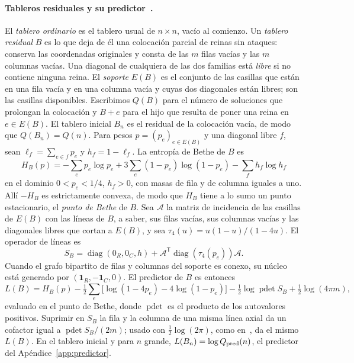 \paragraph{Tableros residuales y su predictor~\cite[\S2 y \S6.1]{tc}.} El \emph{tablero ordinario} es el
tablero usual de \(n\times n\), vacío al comienzo. Un \emph{tablero residual} \(B\) es lo que deja de él
una colocación parcial de reinas sin ataques: conserva las coordenadas originales y consta de las \(m\)
filas vacías y las \(m\) columnas vacías. Una diagonal de cualquiera de las dos familias está
\emph{libre} si no contiene ninguna reina. El \emph{soporte} \(E(B)\) es el conjunto de las casillas que
están en una fila vacía y en una columna vacía y cuyas dos diagonales están libres; son las casillas
disponibles. Escribimos \(Q(B)\) para el número de soluciones que prolongan la colocación y \(B+e\) para
el hijo que resulta de poner una reina en \(e\in E(B)\). El tablero inicial \(B_n\) es el residual de la
colocación vacía, de modo que \(Q(B_n)=Q(n)\). Para pesos \(p=(p_e)_{e\in E(B)}\) y una diagonal libre
\(f\), sean \(\ell_f=\sum_{e\in f}p_e\) y \(h_f=1-\ell_f\). La entropía de Bethe de \(B\) es
\begin{equation}\label{eq:bethe-residual}
 H_B(p)=-\sum_e p_e\log p_e+3\sum_e(1-p_e)\log(1-p_e)-\sum_f h_f\log h_f
\end{equation}
en el dominio \(0<p_e<1/4\), \(h_f>0\), con masas de fila y de columna iguales a uno. Allí \(-H_B\) es
estrictamente convexa, de modo que \(H_B\) tiene a lo sumo un punto estacionario, el \emph{punto de
Bethe} de \(B\). Sea \(\mathcal A\) la matriz de incidencia de las casillas de \(E(B)\) con las líneas
de \(B\), a saber, sus filas vacías, sus columnas vacías y las diagonales libres que cortan a \(E(B)\),
y sea \(\tau_4(u)=u(1-u)/(1-4u)\). El operador de líneas es
\[
 S_B=\operatorname{diag}(0_R,0_C,h)+\mathcal A^{\mathsf T}\operatorname{diag}(\tau_4(p_e))\mathcal A .
\]
Cuando el grafo bipartito de filas y columnas del soporte es conexo, su núcleo está generado por
\((\mathbf1_R,-\mathbf1_C,0)\). El predictor de \(B\) es entonces
\begin{equation}\label{eq:predictor-residual}
 L(B)=H_B(p)-\tfrac12\sum_e\bigl[\log(1-4p_e)-4\log(1-p_e)\bigr]-\tfrac12\log\operatorname{pdet}S_B
      +\tfrac12\log(4\pi m),
\end{equation}
evaluado en el punto de Bethe, donde \(\operatorname{pdet}\) es el producto de los autovalores positivos.
Suprimir en \(S_B\) la fila y la columna de una misma línea axial da un cofactor igual a
\(\operatorname{pdet}S_B/(2m)\); usado con \(\tfrac12\log(2\pi)\), como en~\cite[\S\S6.1 y 7.1]{pc}, da
el mismo \(L(B)\). En el tablero inicial y para \(n\) grande, \(L(B_n)=\log Q_{\rm pred}(n)\), el
predictor del Apéndice~\ref{app:predictor}.

